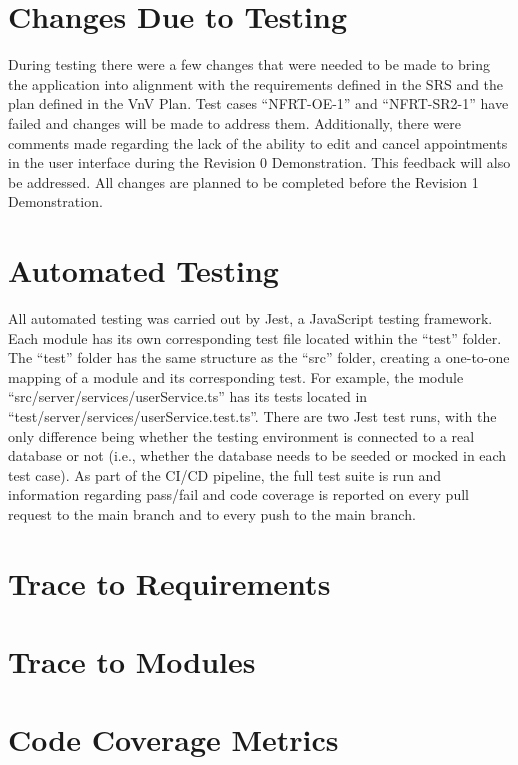 \documentclass[12pt, titlepage]{article}
\begin{document}
\newpage

\section{Changes Due to Testing}

During testing there were a few changes that were needed to be made to bring the application into
alignment with the requirements defined in the SRS and the plan defined in the VnV Plan. Test cases
``NFRT-OE-1'' and ``NFRT-SR2-1'' have failed and changes will be made to address them.
Additionally, there were comments made regarding the lack of the ability to edit and cancel
appointments in the user interface during the Revision 0 Demonstration. This feedback will also be
addressed. All changes are planned to be completed before the Revision 1 Demonstration.

\section{Automated Testing}

All automated testing was carried out by Jest, a JavaScript testing framework. Each module has its
own corresponding test file located within the ``test'' folder. The ``test'' folder has the same
structure as the ``src'' folder, creating a one-to-one mapping of a module and its corresponding
test. For example, the module ``src/server/services/userService.ts'' has its tests located in
``test/server/services/userService.test.ts''. There are two Jest test runs, with the only
difference being whether the testing environment is connected to a real database or not (i.e.,
whether the database needs to be seeded or mocked in each test case). As part of the CI/CD
pipeline, the full test suite is run and information regarding pass/fail and code coverage is
reported on every pull request to the main branch and to every push to the main branch.

\section{Trace to Requirements}

\section{Trace to Modules}

\section{Code Coverage Metrics}
\end{document}
